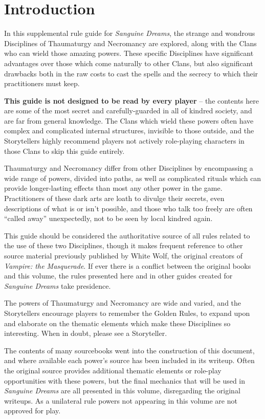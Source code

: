 \section{Introduction}
\label{sec:introduction}
In this supplemental rule guide for \emph{Sanguine Dreams}, the strange and wondrous Disciplines 
of Thaumaturgy and Necromancy are explored, along with the Clans who can wield 
those amazing powers.  These specific Disciplines have significant advantages over those which 
come naturally to other Clans, but also significant drawbacks both in the raw costs to cast 
the spells and the secrecy to which their practitioners must keep.

\textbf{This guide is not designed to be read by every player} -- the contents here are some of 
the most secret and carefully-guarded in all of kindred society, and are far from general knowledge.  
The Clans which wield these powers often have complex and complicated internal structures, invisible 
to those outside, and the Storytellers highly recommend players not actively role-playing 
characters in those Clans to skip this guide entirely.

Thaumaturgy and Necromancy differ from other Disciplines by encompassing a wide range of powers, 
divided into paths, as well as complicated rituals which can provide longer-lasting effects than 
most any other power in the game.  Practitioners of these dark arts are loath to divulge their 
secrets, even descriptions of what is or isn't possible, and those who talk too freely are often 
``called away'' unexpectedly, not to be seen by local kindred again.

This guide should be considered the authoritative source of all rules related to the use of these 
two Disciplines, though it makes frequent reference to other source material previously published 
by White Wolf, the original creators of \emph{Vampire: the Masquerade}.  If ever there is a 
conflict between the original books and this volume, the rules presented here and in other guides 
created for \emph{Sanguine Dreams} take presidence.

The powers of Thaumaturgy and Necromancy are wide and varied, and the Storytellers encourage 
players to remember the Golden Rules, to expand upon and elaborate on the thematic elements which 
make these Disciplines so interesting.  When in doubt, please see a Storyteller.

The contents of many sourcebooks went into the construction of this document, and where available 
each power's source has been included in its writeup.  Often the original source provides additional 
thematic elements or role-play opportunities with these powers, but the final mechanics that will 
be used in \emph{Sanguine Dreams} are all presented in this volume, disregarding the original 
writeups.  As a unilateral rule powers not appearing in this volume are not approved for play. \\

